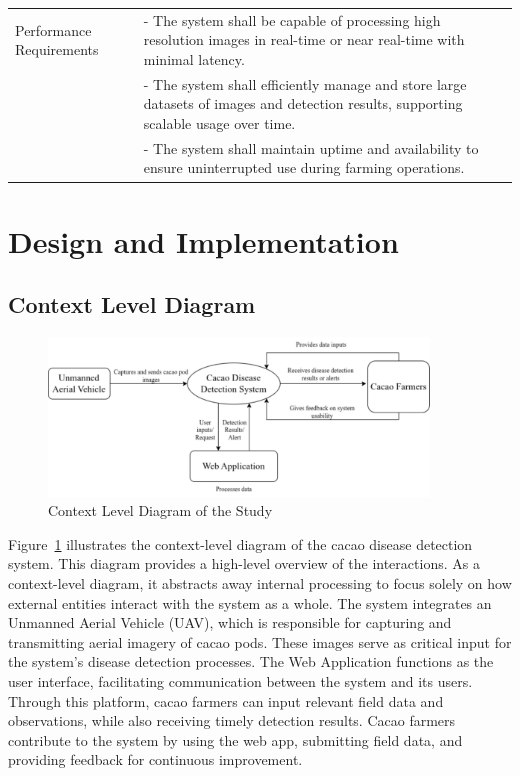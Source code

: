 \begin{longtable}{p{4cm} p{8cm}}
	Performance Requirements & - The system shall be capable of processing high resolution images in real-time or near real-time with minimal latency.                                    \\
	                         & - The system shall efficiently manage and store large datasets of images and detection results, supporting scalable usage over time.                       \\
	                         & - The system shall maintain uptime and availability to ensure uninterrupted use during farming operations.                                                 \\
\end{longtable}

\section{Design and Implementation}

\subsection{Context Level Diagram}

\begin{figure}[H]
	\centering
	\caption{Context Level Diagram of the Study}
	\label{fig:contex-level}
	\includegraphics[width=0.9\textwidth]{figures/Context_Level.pdf}
\end{figure}

Figure~\ref{fig:contex-level} illustrates the context-level diagram of the cacao disease detection system. This diagram provides a high-level overview of the interactions. As a context-level diagram, it abstracts away internal processing to focus solely on how external entities interact with the system as a whole. The system integrates an Unmanned Aerial Vehicle (UAV), which is responsible for capturing and transmitting aerial imagery of cacao pods. These images serve as critical input for the system’s disease detection processes. The Web Application functions as the user interface, facilitating communication between the system and its users. Through this platform, cacao farmers can input relevant field data and observations, while also receiving timely detection results. Cacao farmers contribute to the system by using the web app, submitting field data, and providing feedback for continuous improvement.

